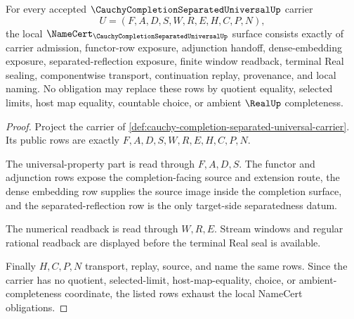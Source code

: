 \begin{theorem}
\label{thm:cauchy-completion-separated-universal-obligations}
For every accepted $\CauchyCompletionSeparatedUniversalUp$ carrier
$$
U=(F,A,D,S,W,R,E,H,C,P,N),
$$
the local $\NameCert_{\CauchyCompletionSeparatedUniversalUp}$ surface consists exactly of carrier admission, functor-row exposure, adjunction handoff, dense-embedding exposure, separated-reflection exposure, finite window readback, terminal Real sealing, componentwise transport, continuation replay, provenance, and local naming. No obligation may replace these rows by quotient equality, selected limits, host map equality, countable choice, or ambient $\RealUp$ completeness.
\end{theorem}
\begin{proof}
Project the carrier of \autoref{def:cauchy-completion-separated-universal-carrier}. Its public rows are exactly $F,A,D,S,W,R,E,H,C,P,N$.

The universal-property part is read through $F,A,D,S$. The functor and adjunction rows expose the completion-facing source and extension route, the dense embedding row supplies the source image inside the completion surface, and the separated-reflection row is the only target-side separatedness datum.

The numerical readback is read through $W,R,E$. Stream windows and regular rational readback are displayed before the terminal Real seal is available.

Finally $H,C,P,N$ transport, replay, source, and name the same rows. Since the carrier has no quotient, selected-limit, host-map-equality, choice, or ambient-completeness coordinate, the listed rows exhaust the local NameCert obligations.
\end{proof}

